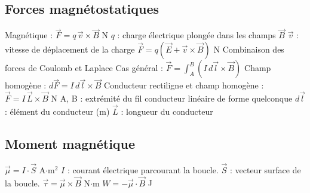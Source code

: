 \subsection{Forces magnétostatiques}
\begin{formules}
    {Magnétique : \newline $\vec F = q\,\vec v\times\vec B$}
    {N}
    {
     $q$ : charge électrique plongée dans les champs $\vec B$ \newline
     $\vec v$ : vitesse de déplacement de la charge}
    {$\vec F = q\left(\vec E + \vec v\times\vec B\right)$}
    {N}
    {Combinaison des forces de Coulomb et Laplace}
    {Cas général : \newline
     $\vec F = \displaystyle\int_A^B \left(I\,d\vec l\times\vec B\right)$ \newline
     Champ homogène : \newline
     $d\vec F = I\,d\vec l\times\vec B$ \newline
     Conducteur rectiligne et champ homogène : \newline
     $\vec F = I\,\vec L\times\vec B$}
    {N}
    {A, B : extrémité du fil conducteur linéaire de forme quelconque \newline
     $d\vec l$ : élément du conducteur (m) \newline
     $\vec L$ : longueur du conducteur
     }
\end{formules}

\subsection{Moment magnétique}
\begin{formules}
    {$\vec\mu = I\cdot\vec S$}
    {A$\cdot$m$^2$}
    {$I$ : courant électrique parcourant la boucle. \newline
     $\vec S$ : vecteur surface de la boucle.
     }
    {$\vec\tau = \vec\mu\times\vec B$}
    {N$\cdot$m}
    {}
    {$W = -\vec\mu\cdot\vec B$}
    {J}
    {}
\end{formules}

